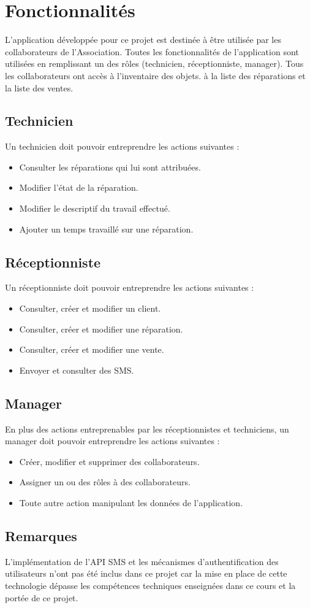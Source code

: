 \documentclass{article}
\begin{document}
\section{Fonctionnalités}
L'application développée pour ce projet est destinée à être utilisée par les collaborateurs de l'Association. Toutes les fonctionnalités de l'application sont utilisées en remplissant un des rôles (technicien, réceptionniste, manager). Tous les collaborateurs ont accès à l'inventaire des objets. à la liste des réparations et la liste des ventes.

\subsection*{Technicien}
Un technicien doit pouvoir entreprendre les actions suivantes :
\begin{itemize}
    \item Consulter les réparations qui lui sont attribuées.
    \item Modifier l'état de la réparation.
    \item Modifier le descriptif du travail effectué.
    \item Ajouter un temps travaillé sur une réparation.
\end{itemize}

\subsection*{Réceptionniste}
Un réceptionniste doit pouvoir entreprendre les actions suivantes :
\begin{itemize}
    \item Consulter, créer et modifier un client.
    \item Consulter, créer et modifier une réparation.
    \item Consulter, créer et modifier une vente.
    \item Envoyer et consulter des SMS.
\end{itemize}

\subsection*{Manager}
En plus des actions entreprenables par les réceptionnistes et techniciens, un manager doit pouvoir entreprendre les actions suivantes :
\begin{itemize}
    \item Créer, modifier et supprimer des collaborateurs.
    \item Assigner un ou des rôles à des collaborateurs.
    \item Toute autre action manipulant les données de l'application.
\end{itemize}

\subsection*{Remarques}
L'implémentation de l'API SMS et les mécanismes d'authentification des utilisateurs n'ont pas été inclus dans ce projet car la mise en place de cette technologie dépasse les compétences techniques enseignées dans ce cours et la portée de ce projet.
\end{document}
